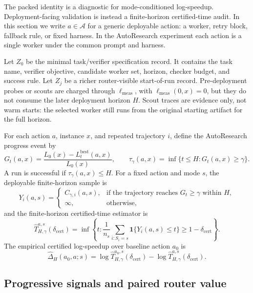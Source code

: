 \documentclass{article}
\newcommand{\newtext}[1]{\textcolor{green!50!black}{#1}}
\newcommand{\cA}{\mathcal{A}}
\begin{document}
{\color{green!50!black}
The packed identity is a diagnostic for mode-conditioned log-speedup.
Deployment-facing validation is instead a finite-horizon certified-time audit.
In this section we write \(a\in\cA\) for a generic deployable action: a worker, retry block, fallback rule, or fixed harness.
In the AutoResearch experiment each action is a single worker under the common prompt and harness.

Let \(Z_0\) be the minimal task/verifier specification record.
It contains the task name, verifier objective, candidate worker set, horizon, checker budget, and success rule.
Let \(Z_j\) be a richer router-visible start-of-run record.
Pre-deployment probes or scouts are charged through \(\ell_{\mathrm{meas}}\), with \(\ell_{\mathrm{meas}}(0,x)=0\), but they do not consume the later deployment horizon \(H\).
Scout traces are evidence only, not warm starts: the selected worker still runs from the original starting artifact for the full horizon.

For each action \(a\), instance \(x\), and repeated trajectory \(i\), define the AutoResearch progress event by
\[
G_t(a,x)=\frac{L_0(x)-L_t^{\mathrm{best}}(a,x)}{L_0(x)},
\qquad
\tau_\gamma(a,x)=\inf\{t\le H:G_t(a,x)\ge\gamma\}.
\]
A run is successful if \(\tau_\gamma(a,x)\le H\).
For a fixed action and mode \(s\), the deployable finite-horizon sample is
\[
Y_i(a,s)
=
\begin{cases}
C_{\gamma,i}(a,s), & \text{if the trajectory reaches }G_t\ge\gamma\text{ within }H,\\
\infty, & \text{otherwise},
\end{cases}
\]
and the finite-horizon certified-time estimator is
\[
\widehat T^{a,s}_{H,\gamma}(\delta_{\mathrm{cert}})
=
\inf\left\{
t:
\frac{1}{n_s}\sum_{i:S_i=s}\mathbf 1\{Y_i(a,s)\le t\}
\ge 1-\delta_{\mathrm{cert}}
\right\}.
\]
The empirical certified log-speedup over baseline action \(a_0\) is
\[
\widehat\Delta_H(a_0,a;s)
=
\log \widehat T^{a_0,s}_{H,\gamma}(\delta_{\mathrm{cert}})
-
\log \widehat T^{a,s}_{H,\gamma}(\delta_{\mathrm{cert}}).
\]
}

\subsection{\newtext{Progressive signals and paired router value}}
\label{subsec:paired}
\end{document}
